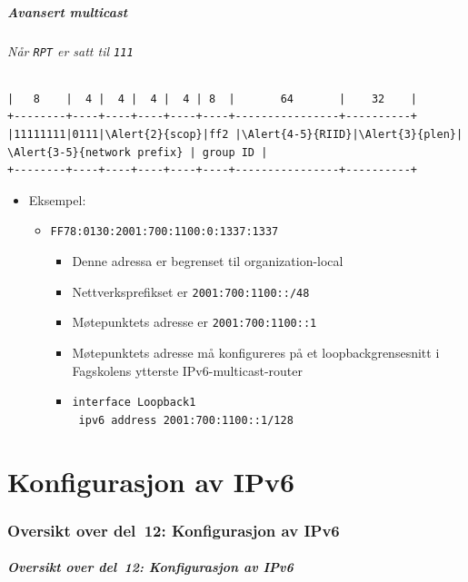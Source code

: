 \begin{frame}[fragile]
  \frametitle{Avansert multicast}
  \framesubtitle{Når \texttt{RPT} er satt til \texttt{111}}
\begin{Verbatim}[commandchars=\\\{\},fontsize=\tiny]
|   8    |  4 |  4 |  4 |  4 | 8  |       64       |    32    |
+--------+----+----+----+----+----+----------------+----------+
|11111111|0111|\Alert{2}{scop}|ff2 |\Alert{4-5}{RIID}|\Alert{3}{plen}| \Alert{3-5}{network prefix} | group ID |
+--------+----+----+----+----+----+----------------+----------+
\end{Verbatim}
  \begin{itemize}
  \item Eksempel:
    \begin{itemize}
    \item \texttt{FF7\alert<2>{8}:0\alert<4-5>{1}\alert<3>{30}:\alert<3-5>{2001:700:1100:0}:1337:1337}
      \begin{itemize}
      \item Denne adressa er begrenset til \alert<2>{organization-local}
      \item Nettverksprefikset er \texttt{\alert<3>{2001:700:1100}::/\alert<3>{48}}
      \item Møtepunktets adresse er \alert<5>{\texttt{\alert<4>{2001:700:1100}::\alert<4>{1}}}
      \item Møtepunktets adresse må konfigureres på et
        loopbackgrensesnitt i Fagskolens ytterste
        IPv6-multicast-router
      \item \texttt{interface Loopback1}\\
        \texttt{\ \alert<5>{ipv6 address 2001:700:1100::1/128}}
      \end{itemize}
    \end{itemize}
  \end{itemize}
\end{frame}

\part{Konfigurasjon av IPv6}

\begin{frame}
  \partpage
\end{frame}

\section*{Oversikt over del~12: Konfigurasjon av IPv6}
\begin{frame}
  \frametitle{Oversikt over del~12: Konfigurasjon av IPv6}
    \tableofcontents
\end{frame}

